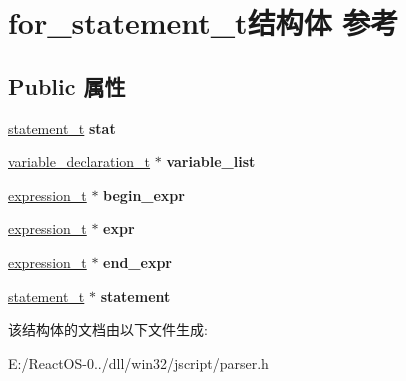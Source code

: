 \hypertarget{structfor__statement__t}{}\section{for\+\_\+statement\+\_\+t结构体 参考}
\label{structfor__statement__t}
\subsection*{Public 属性}
\begin{DoxyCompactItemize}
\item 
\mbox{\label{structfor__statement__t_a4694338306c152225ebdbe5a0bf735ee}} 
\hyperlink{struct__statement__t}{statement\+\_\+t} {\bfseries stat}
\item 
\mbox{\label{structfor__statement__t_aed9576586449f76414bf451cb6fcd363}} 
\hyperlink{struct__variable__declaration__t}{variable\+\_\+declaration\+\_\+t} $\ast$ {\bfseries variable\+\_\+list}
\item 
\mbox{\label{structfor__statement__t_ad531ca4753ce1ab63935843340ea00a2}} 
\hyperlink{struct__expression__t}{expression\+\_\+t} $\ast$ {\bfseries begin\+\_\+expr}
\item 
\mbox{\label{structfor__statement__t_a763dae896b87248d2b86e96946317cb3}} 
\hyperlink{struct__expression__t}{expression\+\_\+t} $\ast$ {\bfseries expr}
\item 
\mbox{\label{structfor__statement__t_ab5c47b61f2bad53bc13bf17934c1ccf5}} 
\hyperlink{struct__expression__t}{expression\+\_\+t} $\ast$ {\bfseries end\+\_\+expr}
\item 
\mbox{\label{structfor__statement__t_a7e5eb161096955568c6caf8ebf6996ab}} 
\hyperlink{struct__statement__t}{statement\+\_\+t} $\ast$ {\bfseries statement}
\end{DoxyCompactItemize}


该结构体的文档由以下文件生成\+:\begin{DoxyCompactItemize}
\item 
E\+:/\+React\+O\+S-\/0../dll/win32/jscript/parser.\+h\end{DoxyCompactItemize}
